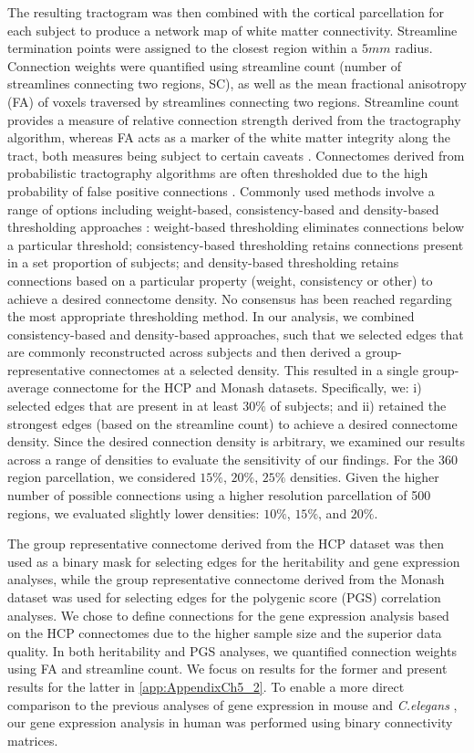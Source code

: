 The resulting tractogram was then combined with the cortical parcellation for each subject to produce a network map of white matter connectivity. Streamline termination points were assigned to the closest region within a $5mm$ radius. Connection weights were quantified using streamline count (number of streamlines connecting two regions, SC), as well as the mean fractional anisotropy (FA) of voxels traversed by streamlines connecting two regions. Streamline count provides a measure of relative connection strength derived from the tractography algorithm, whereas FA acts as a marker of the white matter integrity along the tract, both measures being subject to certain caveats \citep{Jones2013}.
Connectomes derived from probabilistic tractography algorithms are often thresholded due to the high probability of false positive connections \citep{Sarwar2019,Sotiropoulos2017}. Commonly used methods involve a range of options including weight-based, consistency-based and density-based thresholding approaches \citep{Betzel2018,Roberts2016a}: weight-based thresholding eliminates connections below a particular threshold; consistency-based thresholding retains connections present in a set proportion of subjects; and density-based thresholding retains connections based on a particular property (weight, consistency or other) to achieve a desired connectome density. No consensus has been reached regarding the most appropriate thresholding method. In our analysis, we combined consistency-based and density-based approaches, such that we selected edges that are commonly reconstructed across subjects and then derived a group-representative connectomes at a selected density. This resulted in a single group-average connectome for the HCP and Monash datasets. Specifically, we: i) selected edges that are present in at least $30\%$ of subjects; and ii) retained the strongest edges (based on the streamline count) to achieve a desired connectome density. Since the desired connection density is arbitrary, we examined our results across a range of densities to evaluate the sensitivity of our findings. For the 360 region parcellation, we considered $15\%$, $20\%$, $25\%$ densities. Given the higher number of possible connections using a higher resolution parcellation of 500 regions, we evaluated slightly lower densities: $10\%$, $15\%$, and $20\%$.

The group representative connectome derived from the HCP dataset was then used as a binary mask for selecting edges for the heritability and gene expression analyses, while the group representative connectome derived from the Monash dataset was used for selecting edges for the polygenic score (PGS) correlation analyses. We chose to define connections for the gene expression analysis based on the HCP connectomes due to the higher sample size and the superior data quality. In both heritability and PGS analyses, we quantified connection weights using FA and streamline count. We focus on results for the former and present results for the latter in \ref{app:AppendixCh5_2}. To enable a more direct comparison to the previous analyses of gene expression in mouse \citep{Fulcher2016} and \textit{C.elegans} \citep{Arnatkeviciute2018}, our gene expression analysis in human was performed using binary connectivity matrices.


